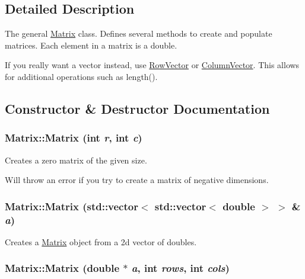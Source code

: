 \subsection{Detailed Description}
The general \hyperlink{class_matrix}{Matrix} class. Defines several methods to create and populate matrices. Each element in a matrix is a double.

If you really want a vector instead, use \hyperlink{class_row_vector}{RowVector} or \hyperlink{class_column_vector}{ColumnVector}. This allows for additional operations such as length(). 

\subsection{Constructor \& Destructor Documentation}
\hypertarget{class_matrix_a07a3cee5bc286ca27ceffe81ce5a2d01}{
\subsubsection[{Matrix}]{\setlength{\rightskip}{0pt plus 5cm}Matrix::Matrix (int {\em r}, \/  int {\em c})}}
\label{class_matrix_a07a3cee5bc286ca27ceffe81ce5a2d01}


Creates a zero matrix of the given size. 

Will throw an error if you try to create a matrix of negative dimensions. \hypertarget{class_matrix_a0db283ef4ea2660f8d0c1b58f9e74f49}{
\subsubsection[{Matrix}]{\setlength{\rightskip}{0pt plus 5cm}Matrix::Matrix (std::vector$<$ std::vector$<$ double $>$ $>$ \& {\em a})}}
\label{class_matrix_a0db283ef4ea2660f8d0c1b58f9e74f49}


Creates a \hyperlink{class_matrix}{Matrix} object from a 2d vector of doubles. 

\hypertarget{class_matrix_a3179cefb929e09cbdc95d143e1d9e3d2}{
\subsubsection[{Matrix}]{\setlength{\rightskip}{0pt plus 5cm}Matrix::Matrix (double $\ast$ {\em a}, \/  int {\em rows}, \/  int {\em cols})}}
\label{class_matrix_a3179cefb929e09cbdc95d143e1d9e3d2}


